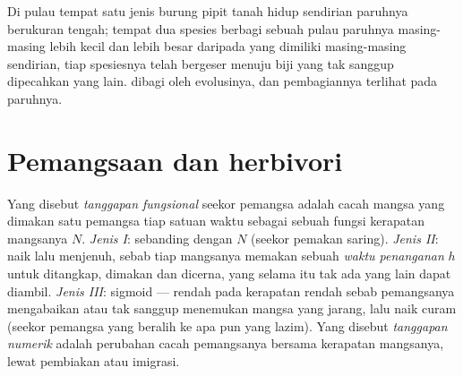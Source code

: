 \begin{example}\label{ex:b1:species-interactions:finches}
Di pulau tempat satu jenis burung pipit tanah hidup sendirian
paruhnya berukuran tengah; tempat dua spesies berbagi sebuah pulau
paruhnya masing-masing lebih kecil dan lebih besar daripada yang
dimiliki masing-masing sendirian, tiap spesiesnya telah bergeser
menuju biji yang tak sanggup dipecahkan yang lain.  dibagi
oleh evolusinya, dan pembagiannya terlihat pada paruhnya.
\end{example}

\section{Pemangsaan dan herbivori}

\begin{definition}\label{def:b1:species-interactions:functional}
Yang disebut \emph{tanggapan fungsional} seekor pemangsa adalah cacah
mangsa yang dimakan satu pemangsa tiap satuan waktu sebagai sebuah
fungsi kerapatan mangsanya $N$. \emph{Jenis I}: sebanding dengan $N$
(seekor pemakan saring). \emph{Jenis II}: naik lalu menjenuh, sebab
tiap mangsanya memakan sebuah \emph{waktu penanganan} $h$ untuk
ditangkap, dimakan dan dicerna, yang selama itu tak ada yang lain
dapat diambil. \emph{Jenis III}: sigmoid --- rendah pada kerapatan
rendah sebab pemangsanya mengabaikan atau tak sanggup menemukan mangsa
yang jarang, lalu naik curam (seekor pemangsa yang beralih ke apa pun
yang lazim). Yang disebut \emph{tanggapan numerik} adalah perubahan
cacah pemangsanya bersama kerapatan mangsanya, lewat pembiakan atau
imigrasi.
\end{definition}

